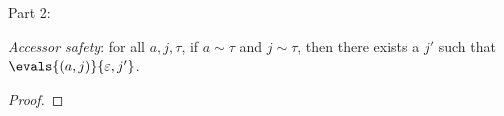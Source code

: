 \documentclass[11pt]{article}
\newcommand{\matches}[2]{{#1}\sim{#2}}   %
\newcommand{\aeps}{\varepsilon}          %
\begin{document}
Part 2:

\begin{mathpar}



\end{mathpar}

\textit{Accessor safety}: for all $a, j, \tau$, if $\matches{a}{\tau}$ and $\matches{j}{\tau}$, then there exists a $j'$ such that $\evals{(a, j)}{\aeps, j'}$.

\begin{proof}
\end{proof}
\end{document}
